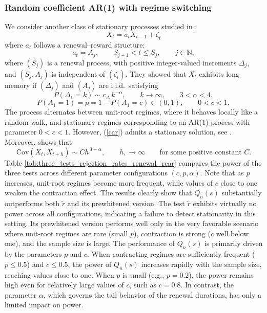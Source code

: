 \documentclass[10pt,a4paper]{amsart}
\numberwithin{equation}{section}
\begin{document}
\subsubsection{Random coefficient AR(1) with regime switching}
We consider another class of stationary processes  studied in \cite{Leipus2003}:
\begin{equation}\label{car}
X_t = a_tX_{t-1}+\zeta_t
\end{equation}
where \(a_t\) follows a renewal–reward structure:
\[
a_t = A_j, \qquad S_{j-1} < t \le S_j, \qquad j \in \mathbb{N},
\]
where \((S_j)\) is a renewal process, with positive integer-valued increments $\Delta_j$, and \((S_j, A_j)\) is independent of \((\zeta_t)\).
They showed that $X_t$ exhibits long memory if \((\Delta_j)\) and \((A_j)\) are i.i.d.\ satisfying
\begin{equation*}P(\Delta_1=k)\sim c_\Delta\, k^{-\alpha}, \qquad  k \to \infty,
\qquad 3 < \alpha < 4,
\end{equation*}
$$
P(A_1 = 1)=p=1-P(A_1=c)\in(0,1), \qquad 0<c<1,
$$
The process alternates between unit-root regimes, where it behaves locally like a random walk, and stationary regimes corresponding to an AR(1) process with parameter $0<c<1$. However, (\ref{car}) admits a stationary solution, see \cite{Brandt1986}.
Moreover, \cite{Leipus2003} shows that
\[
\mathrm{Cov}(X_t,X_{t+h})
   \sim Ch^{\,3 - \alpha}, 
\qquad h, \to \infty\qquad\textrm{for some positive constant }C.
\]
Table \ref{tab:three_tests_rejection_rates_renewal_rcar} compares the power of the three tests across different parameter configurations $(c,p,\alpha)$. Note that  as $p$ increases, unit-root regimes become more frequent, while values of $c$ close to one weaken the contraction effect. The results clearly show that $Q_n(s)$ substantially outperforms both $\tilde r$ and its prewhitened version.
The test $\tilde r$ exhibits virtually no power across all configurations, indicating a failure to detect stationarity in this setting. Its prewhitened version performs well only in the very favorable scenario where unit-root regimes are rare (small $p$), contraction is strong ($c$ well below one), and the sample size is large.
The performance of $Q_n(s)$ is primarily driven by the parameters $p$ and $c$. 
When contracting regimes are sufficiently frequent ( $p\le0.5$) and  $c\le0.5$, the power of $Q_n(s)$ increases rapidly with the sample size, reaching values close to one. When $p$ is small (e.g., $p=0.2$), the power remains high even for relatively large values of $c$, such as $c=0.8$. In contrast, the parameter $\alpha$, which governs the tail behavior of the renewal durations, has only a limited impact on power.
\end{document}
